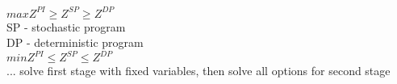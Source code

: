 \documentclass{article}
\begin{document}
$ max Z^{PI} \geq Z^{SP} \geq Z^{DP}$\\
SP - stochastic program\\
DP - deterministic program\\

$ min Z^{PI} \leq Z^{SP} \leq Z^{DP}$\\

... solve first stage with fixed variables, then solve all options for second stage
\end{document}
